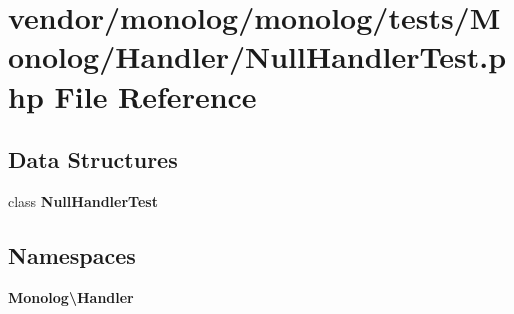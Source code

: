 \section{vendor/monolog/monolog/tests/\+Monolog/\+Handler/\+Null\+Handler\+Test.php File Reference}
\label{_null_handler_test_8php}
\subsection*{Data Structures}
\begin{DoxyCompactItemize}
\item 
class {\bf Null\+Handler\+Test}
\end{DoxyCompactItemize}
\subsection*{Namespaces}
\begin{DoxyCompactItemize}
\item 
 {\bf Monolog\textbackslash{}\+Handler}
\end{DoxyCompactItemize}
